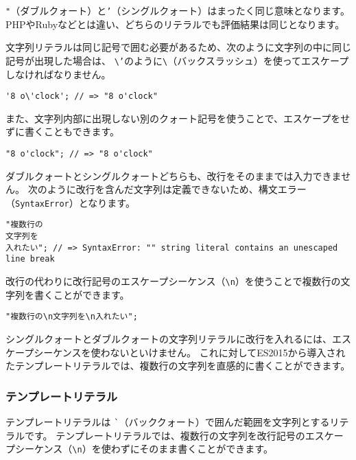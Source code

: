\texttt{"}（ダブルクォート）と\texttt{'}（シングルクォート）はまったく同じ意味となります。
PHPやRubyなどとは違い、どちらのリテラルでも評価結果は同じとなります。

文字列リテラルは同じ記号で囲む必要があるため、次のように文字列の中に同じ記号が出現した場合は、
\texttt{\textbackslash'}のように\texttt{\textbackslash}（バックスラッシュ）を使ってエスケープしなければなりません。

\begin{lstlisting}
'8 o\'clock'; // => "8 o'clock"
\end{lstlisting}

また、文字列内部に出現しない別のクォート記号を使うことで、エスケープをせずに書くこともできます。

\begin{lstlisting}
"8 o'clock"; // => "8 o'clock"
\end{lstlisting}

ダブルクォートとシングルクォートどちらも、改行をそのままでは入力できません。
次のように改行を含んだ文字列は定義できないため、構文エラー（\texttt{SyntaxError}）となります。

\begin{lstlisting}
"複数行の
文字列を
入れたい"; // => SyntaxError: "" string literal contains an unescaped line break
\end{lstlisting}

改行の代わりに改行記号のエスケープシーケンス（\texttt{\textbackslash n}）を使うことで複数行の文字列を書くことができます。

\begin{lstlisting}
"複数行の\n文字列を\n入れたい";
\end{lstlisting}

シングルクォートとダブルクォートの文字列リテラルに改行を入れるには、エスケープシーケンスを使わないといけません。
これに対してES2015から導入されたテンプレートリテラルでは、複数行の文字列を直感的に書くことができます。

\hypertarget{template-literal}{%
\subsubsection{テンプレートリテラル\protect{}}\label{template-literal}}

テンプレートリテラルは
\lstinline{`}（バッククォート）で囲んだ範囲を文字列とするリテラルです。
テンプレートリテラルでは、複数行の文字列を改行記号のエスケープシーケンス（\texttt{\textbackslash n}）を使わずにそのまま書くことができます。

